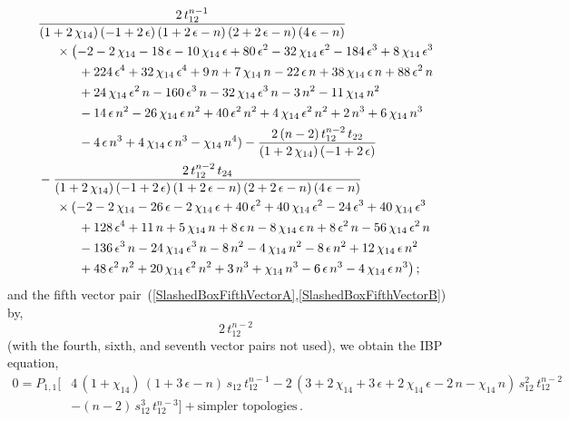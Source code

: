 \documentclass[aps,prd,preprint,groupedaddress,nofootinbib,showpacs,eqsecnum]{revtex4}
\def\eps{\epsilon}
\def\Pn#1#2{P_{#1,#2}}
\begin{document}
\begin{equation}
\begin{aligned}
&\frac{2\,t_{12}^{n-1}}
{(1+2\,\chi_{14})\,(-1+2\,\eps)\,(1+2\,\eps-n)\,(2+2\,\eps-n)\,(4\,\eps-n)}
\\&\indentP\bigl(-2-2\,\chi_{14}-18\,\eps-10\,\chi_{14}\,\eps+80\,\eps^{2}
-32\,\chi_{14}\,\eps^{2}-184\,\eps^{3}+8\,\chi_{14}\,\eps^{3}
\\ &\indentPA
+224\,\eps^{4}+32\,\chi_{14}\,\eps^{4}+9\,n+7\,\chi_{14}\,n
-22\,\eps\,n+38\,\chi_{14}\,\eps\,n+88\,\eps^{2}\,n
\\ &\indentPA
+24\,\chi_{14}\,\eps^{2}\,n-160\,\eps^{3}\,n
-32\,\chi_{14}\,\eps^{3}\,n-3\,n^{2}-11\,\chi_{14}\,n^{2}
\\ &\indentPA
-14\,\eps\,n^{2}-26\,\chi_{14}\,\eps\,n^{2}+40\,\eps^{2}\,n^{2}
+4\,\chi_{14}\,\eps^{2}\,n^{2}+2\,n^{3}+6\,\chi_{14}\,n^{3}
\\ &\indentPA
-4\,\eps\,n^{3}+4\,\chi_{14}\,\eps\,n^{3}-\chi_{14}\,n^{4})
-\frac{2\,(n-2)\,t_{12}^{n-2}\,t_{22}}{(1+2\,\chi_{14})\,(-1+2\,\eps)}
\\ &
-\frac{2\,t_{12}^{n-2}\,t_{24}}
{(1+2\,\chi_{14})\,(-1+2\,\eps)\,(1+2\,\eps-n)\,(2+2\,\eps-n)\,(4\,\eps-n)}
\\&\indentP(-2-2\,\chi_{14}-26\,\eps-2\,\chi_{14}\,\eps+40\,\eps^{2}
+40\,\chi_{14}\,\eps^{2}-24\,\eps^{3}+40\,\chi_{14}\,\eps^{3}
\\ &\indentPA
+128\,\eps^{4}+11\,n+5\,\chi_{14}\,n+8\,\eps\,n
-8\,\chi_{14}\,\eps\,n+8\,\eps^{2}\,n-56\,\chi_{14}\,\eps^{2}\,n
\\ &\indentPA
-136\,\eps^{3}\,n-24\,\chi_{14}\,\eps^{3}\,n-8\,n^{2}
-4\,\chi_{14}\,n^{2}-8\,\eps\,n^{2}+12\,\chi_{14}\,\eps\,n^{2}
\\ &\indentPA
+48\,\eps^{2}\,n^{2}+20\,\chi_{14}\,\eps^{2}\,n^{2}+3\,n^{3}
+\chi_{14}\,n^{3}-6\,\eps\,n^{3}-4\,\chi_{14}\,\eps\,n^{3}\bigr)
\,;
\end{aligned}
\end{equation}
and the fifth vector
 pair~(\ref{SlashedBoxFifthVectorA},\ref{SlashedBoxFifthVectorB}) by,
\begin{equation}
2\,t_{12}^{n-2}
\end{equation}
(with the fourth, sixth, and seventh vector pairs not used), we obtain the IBP
equation,
\begin{equation}
\begin{aligned}
0 = \Pn11\bigl[&
4\,(1+\chi_{14})\,(1+3\,\eps-n)\,s_{12}\,t_{12}^{n-1}
-2\,(3+2\,\chi_{14}+3\,\eps+2\,\chi_{14}\,\eps-2\,n
-\chi_{14}\,n)\,s_{12}^{2}\,t_{12}^{n-2}
\\ &
-(n-2)\,s_{12}^{3}\,t_{12}^{n-3}
\bigr]+\textrm{simpler\ topologies}\,.
\end{aligned}
\end{equation}
\end{document}
